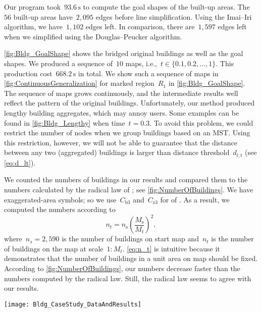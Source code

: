 Our program took~$93.6\,\mathrm{s}$ 
to compute the goal shapes of the built-up areas.
The~$56$ built-up areas have~$2{,}095$ edges before line 
simplification.
Using the Imai--Iri algorithm, we have~$1{,}102$ edges left.
In comparison, there are~$1{,}597$ edges left 
when we simplified using the Douglas--Peucker algorithm.

\fig\ref{fig:Bldg_GoalShape} shows 
the bridged original buildings as well as the goal shapes.
We produced a sequence of~$10$ maps,
i.e.,~$t \in \{0.1, 0.2, \dots, 1\}$.
This production cost~$668.2\,\mathrm{s}$ in total.
We show such a sequence of maps in 
\fig\ref{fig:ContinuousGeneralization} for 
marked region~$R_1$ in \fig\ref{fig:Bldg_GoalShape}.
The sequence of maps grows continuously, and 
the intermediate results well reflect 
the pattern of the original buildings.
%
Unfortunately, our method produced 
lengthy building aggregates, 
which may annoy users.
Some examples can be found in
\fig\ref{fig:Bldg_Lengthy} when time~$t=0.3$.
To avoid this problem, we could restrict the number of nodes
when we group buildings based on an MST.
Using this restriction, however, 
we will not be able to guarantee that 
the distance between any two (aggregated) buildings 
is larger than distance threshold~$d_{l,t}$
(see \eq\ref{eq:d_lt}).

We counted the numbers of buildings in our results
and compared them to the numbers calculated by
the radical law of \citet{Topfer1966}; 
see \fig\ref{fig:NumberOfBuildings}.
We have exaggerated-area symbols; 
so we use~$C_\mathrm{b3}$ and~$C_\mathrm{z3}$ 
for  of \citet{Topfer1966}.
As a result, we computed the numbers according to
\begin{equation}
\label{eq:n_t}
n_t=n_\mathrm{s}\left( \frac{M_\mathrm{s}}{M_t}\right) ^2,
\end{equation}
where~$n_s=2{,}590$ is the number of buildings on start map
and~$n_t$ is the number of buildings on the map at scale~$1:M_t$.
\eq\ref{eq:n_t} is intuitive because 
it demonstrates that the number of buildings in a 
unit area on map should be fixed.
According to \fig\ref{fig:NumberOfBuildings}, 
our numbers decrease faster than 
the numbers computed by the radical law.
Still, the radical law seems to agree with our results.


\begin{figure*}[tb]
	\centering
	\texttt{[image: Bldg\_CaseStudy\_DataAndResults]}
	\caption{Bridged original buildings and
		goal shapes (darker polygons),
		without eliminating small buildings and holes, 
		where the goal shapes are for scale~$1:50{,}000$.
		There are~$56$ goal shapes, which have~$1{,}135$ 
		edges in total.
	}
	\label{fig:Bldg_GoalShape}
\end{figure*}




